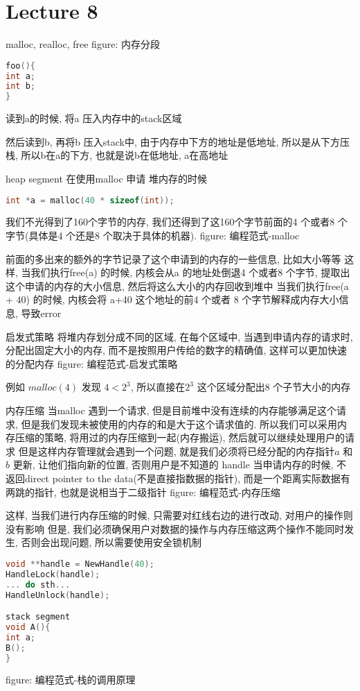 \documentclass{article}
\begin{document}
\section{Lecture 8}
malloc, realloc, free
figure: 内存分段
 

\begin{lstlisting}[language = C]
foo(){
int a;
int b;
}
\end{lstlisting}
读到a的时候, 将a 压入内存中的stack区域
 
然后读到b, 再将b 压入stack中, 由于内存中下方的地址是低地址, 所以是从下方压栈, 所以b在a的下方, 也就是说b在低地址, a在高地址
 
heap segment
在使用malloc 申请 堆内存的时候
\begin{lstlisting}[language = C]
int *a = malloc(40 * sizeof(int));
\end{lstlisting}
我们不光得到了160个字节的内存,  我们还得到了这160个字节前面的4 个或者8 个字节(具体是4 个还是8 个取决于具体的机器).
figure: 编程范式-malloc
 
前面的多出来的额外的字节记录了这个申请到的内存的一些信息, 比如大小等等
这样, 当我们执行free(a) 的时候, 内核会从a 的地址处倒退4 个或者8 个字节, 提取出这个申请的内存的大小信息, 然后将这么大小的内存回收到堆中
当我们执行free(a + 40) 的时候, 内核会将 a+40 这个地址的前4 个或者 8 个字节解释成内存大小信息, 导致error

启发式策略
将堆内存划分成不同的区域, 在每个区域中, 当遇到申请内存的请求时, 分配出固定大小的内存, 而不是按照用户传给的数字的精确值, 这样可以更加快速的分配内存
figure: 编程范式-启发式策略
 
例如 $malloc(4)$ 发现 $4 < 2^3$, 所以直接在$2^3$ 这个区域分配出$8$ 个子节大小的内存

内存压缩
当malloc 遇到一个请求, 但是目前堆中没有连续的内存能够满足这个请求, 但是我们发现未被使用的内存的和是大于这个请求值的.
所以我们可以采用内存压缩的策略, 将用过的内存压缩到一起(内存搬运), 然后就可以继续处理用户的请求
但是这样内存管理就会遇到一个问题, 就是我们必须将已经分配的内存指针$a$ 和 $b$ 更新, 让他们指向新的位置, 否则用户是不知道的
handle
当申请内存的时候, 不返回direct pointer to the data(不是直接指数据的指针), 而是一个距离实际数据有两跳的指针, 也就是说相当于二级指针
figure: 编程范式-内存压缩
 
这样, 当我们进行内存压缩的时候, 只需要对红线右边的进行改动, 对用户的操作则没有影响
但是, 我们必须确保用户对数据的操作与内存压缩这两个操作不能同时发生, 否则会出现问题, 所以需要使用安全锁机制
\begin{lstlisting}[language = C]
void **handle = NewHandle(40);
HandleLock(handle);
... do sth...
HandleUnlock(handle);

stack segment
void A(){
int a;
B();
}
\end{lstlisting}
figure: 编程范式-栈的调用原理
 
\end{document}
